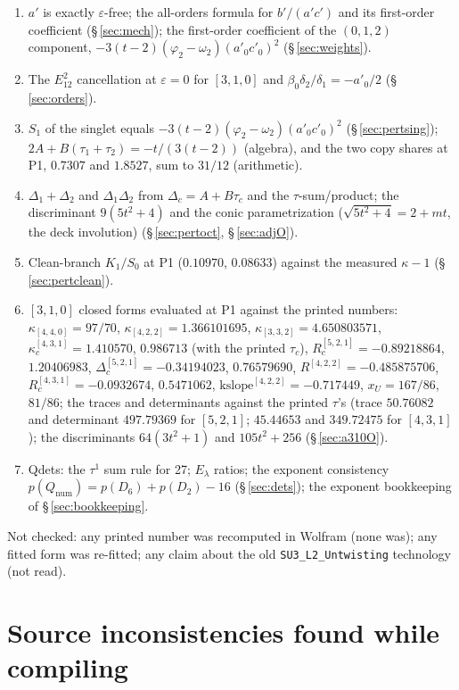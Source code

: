 \documentclass[10pt]{article}
\newcommand{\nb}[1]{\texttt{#1}}
\begin{document}
\begin{enumerate}\setlength{\itemsep}{1pt}
\item $a'$ is exactly $\varepsilon$-free; the all-orders formula for $b'/(a'c')$ and its first-order coefficient (\S\,\ref{sec:mech}); the first-order coefficient of the $(0,1,2)$ component, $-3(t-2)(\varphi_2-\omega_2)(a'_0c'_0)^2$ (\S\,\ref{sec:weights}).
\item The $E_{12}^2$ cancellation at $\varepsilon=0$ for $[3,1,0]$ and $\beta_0\delta_2/\delta_1=-a'_0/2$ (\S\,\ref{sec:orders}).
\item $S_1$ of the singlet equals $-3(t-2)(\varphi_2-\omega_2)(a'_0c'_0)^2$ (\S\,\ref{sec:pertsing}); $2A+B(\tau_1+\tau_2)=-t/(3(t-2))$ (algebra), and the two copy shares at P1, $0.7307$ and $1.8527$, sum to $31/12$ (arithmetic).
\item $\Delta_1+\Delta_2$ and $\Delta_1\Delta_2$ from $\Delta_c=A+B\tau_c$ and the $\tau$-sum/product; the discriminant $9(5t^2+4)$ and the conic parametrization ($\sqrt{5t^2+4}=2+mt$, the deck involution) (\S\,\ref{sec:pertoct}, \S\,\ref{sec:adjO}).
\item Clean-branch $K_1/S_0$ at P1 ($0.10970$, $0.08633$) against the measured $\kappa-1$ (\S\,\ref{sec:pertclean}).
\item $[3,1,0]$ closed forms evaluated at P1 against the printed numbers: $\kappa_{[4,4,0]}=97/70$, $\kappa_{[4,2,2]}=1.366101695$, $\kappa_{[3,3,2]}=4.650803571$, $\kappa_c^{[4,3,1]}=1.410570$, $0.986713$ (with the printed $\tau_c$), $R_c^{[5,2,1]}=-0.89218864$, $1.20406983$, $\Delta_c^{[5,2,1]}=-0.34194023$, $0.76579690$, $R^{[4,2,2]}=-0.485875706$, $R_c^{[4,3,1]}=-0.0932674$, $0.5471062$, $\mathrm{kslope}^{[4,2,2]}=-0.717449$, $x_U=167/86$, $81/86$; the traces and determinants against the printed $\tau$'s (trace $50.76082$ and determinant $497.79369$ for $[5,2,1]$; $45.44653$ and $349.72475$ for $[4,3,1]$); the discriminants $64(3t^2+1)$ and $105t^2+256$ (\S\,\ref{sec:a310O}).
\item Qdets: the $\tau^1$ sum rule for 27; $E_\lambda$ ratios; the exponent consistency $p(Q_{\mathrm{num}})=p(D_6)+p(D_2)-16$ (\S\,\ref{sec:dets}); the exponent bookkeeping of \S\,\ref{sec:bookkeeping}.
\end{enumerate}

Not checked: any printed number was recomputed in Wolfram (none was); any fitted form was re-fitted; any claim about the old \nb{SU3\_\allowbreak{}L2\_\allowbreak{}Untwisting} technology (not read).

\section{Source inconsistencies found while compiling}\label{app:incons}
\end{document}

